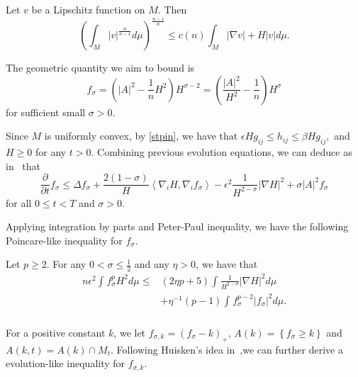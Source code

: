\begin{lemma} \label{MSeu}
    Let $v$ be a Lipschitz function on $M$. Then
    \[\left( \int_{M}^{}\left| v \right| ^{\frac{n}{n-1}} d \mu  \right)^{\frac{n-1}{n}} \leq c(n)\int_{M}^{} \left| \nabla v \right| + H \left| v \right|  d \mu. \]
\end{lemma}

The geometric quantity we aim to bound is 
\[f_\sigma = \left( \left| A \right| ^2-\frac{1}{n}H^2 \right) H^{\sigma-2} = \left( \frac{\left| A \right| ^2}{H^2}-\frac{1}{n} \right) H^{\sigma} \]
for sufficient small $\sigma >0$.

Since $M$ is uniformly convex, by \autoref{stpin}, we have that $\epsilon H g_{ij }^{} \leq h_{ij }^{} \leq \beta H g_{ij }^{} ,$ and $H \geq 0$ for any $t>0$.  Combining previous evolution equations, we can deduce as in~\cite[Corollary 5.3]{huisken_flow_1984} that
\begin{equation} \label{evof}
    \frac{\partial }{\partial t} f_\sigma \leq \Delta f_\sigma + \frac{2(1-\sigma )}{H}\left\langle \nabla _i H, \nabla_{i}^{} f_\sigma  \right\rangle - \epsilon ^2 \frac{1}{H^{2-\sigma }}\left| \nabla H \right| ^2+\sigma \left| A \right| ^2 f_\sigma
\end{equation}
for all $0 \leq t < T$ and $\sigma >0$. 

Applying integration by parts and Peter-Paul inequality, we have the following Poincare-like inequality for $f_\sigma $.

\begin{lemma}
    Let $p \geq 2$. For any $0 < \sigma \leq \frac{1}{2}$ and any $\eta >0$, we have that 
    \begin{equation*}
    \begin{split}
        n \epsilon ^2 \int_{}^{}f_{\sigma }^{p} H^2d \mu \leq& \left( 2 \eta p+5 \right) \int_{}^{}\frac{1}{H^{2-\sigma }}\left| \nabla H \right| ^2 d \mu  \\
    &+ \eta ^{-1}\left( p-1 \right) \int_{}^{}f_{\sigma }^{p-2} \left| f_{\sigma }^{}  \right| ^2 d \mu .  \\
    \end{split}
    \end{equation*} 
\end{lemma}

For a positive constant $k$, we let $f_{\sigma ,k}^{} =(f_{\sigma }^{} -k)_+$, $A(k)=\left\{ f_{\sigma }^{} \geq k \right\} $ and $A(k,t)=A(k)\cap M_t.$ Following Huisken's idea in~\cite[Lemma 5.5]{huisken_flow_1984},we can further derive a evolution-like inequality for $f_{\sigma ,k}$.

